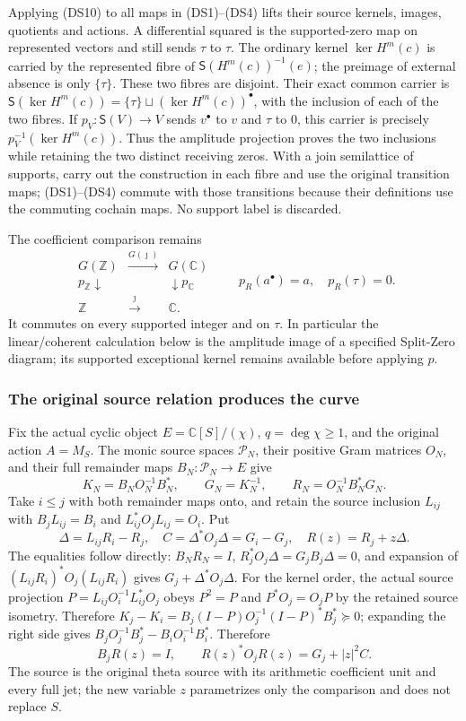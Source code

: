 Applying (DS10) to all maps in (DS1)--(DS4) lifts their source kernels,
images, quotients and actions.  A differential squared is the
supported-zero map on represented vectors and still sends $\tau$ to
$\tau$.  The ordinary kernel $\ker H^m(c)$ is carried by the
represented fibre of $\mathsf S(H^m(c))^{-1}(e)$; the preimage of
external absence is only $\{\tau\}$.  These two fibres are disjoint.
Their exact common carrier is
$\mathsf S(\ker H^m(c))=\{\tau\}\sqcup(\ker H^m(c))^\bullet$,
with the inclusion of each of the two fibres.  If
$p_V:\mathsf S(V)\to V$ sends $v^\bullet$ to $v$ and $\tau$ to
$0$, this carrier is precisely $p_V^{-1}(\ker H^m(c))$.
Thus the amplitude projection proves the two inclusions while
retaining the two distinct receiving zeros.  With a join semilattice
of supports, carry out the construction
in each fibre and use the original transition maps; (DS1)--(DS4) commute
with those transitions because their definitions use the commuting
cochain maps.  No support label is discarded.

The coefficient comparison remains
\[
 \begin{array}{ccc}
 G(\mathbb Z)&\xrightarrow{G(\jmath)}&G(\mathbb C)\\
 p_{\mathbb Z}\downarrow&&\downarrow p_{\mathbb C}\\
 \mathbb Z&\xrightarrow{\jmath}&\mathbb C.
 \end{array}\qquad
 p_R(a^\bullet)=a,\quad p_R(\tau)=0.
 \tag{DS11}
\]
It commutes on every supported integer and on $\tau$.  In particular
the linear/coherent calculation below is the amplitude image of a
specified Split-Zero diagram; its supported exceptional kernel remains
available before applying $p$.

\subsubsection{The original source relation produces the curve}

Fix the actual cyclic object $E=\mathbb C[S]/(\chi)$, $q=\deg\chi\geq1$,
and the original action $A=M_S$.  The monic source spaces
$\mathcal P_N$, their positive Gram matrices $O_N$, and their full
remainder maps $B_N:\mathcal P_N\to E$ give
\[
 K_N=B_NO_N^{-1}B_N^*,\qquad G_N=K_N^{-1},\qquad
 R_N=O_N^{-1}B_N^*G_N.
 \tag{DS12}
\]
Take $i\leq j$ with both remainder maps onto, and retain the source
inclusion $L_{ij}$ with
$B_jL_{ij}=B_i$ and $L_{ij}^*O_jL_{ij}=O_i$.  Put
\[
 \Delta=L_{ij}R_i-R_j,
 \quad C=\Delta^*O_j\Delta=G_i-G_j,
 \quad R(z)=R_j+z\Delta.
 \tag{DS13}
\]
The equalities follow directly: $B_NR_N=I$,
$R_j^*O_j\Delta=G_jB_j\Delta=0$, and expansion of
$(L_{ij}R_i)^*O_j(L_{ij}R_i)$ gives $G_j+\Delta^*O_j\Delta$.
For the kernel order, the actual source projection
$P=L_{ij}O_i^{-1}L_{ij}^*O_j$ obeys $P^2=P$ and
$P^*O_j=O_jP$ by the retained source isometry.  Therefore
$K_j-K_i=B_j(I-P)O_j^{-1}(I-P)^*B_j^*\succeq0$;
expanding the right side gives $B_jO_j^{-1}B_j^*-B_iO_i^{-1}B_i^*$.
Therefore
\[
 B_jR(z)=I,\qquad R(z)^*O_jR(z)=G_j+|z|^2C.
 \tag{DS14}
\]
The source is the original theta source with its arithmetic coefficient
unit and every full jet; the new variable $z$ parametrizes only the
comparison and does not replace $S$.

